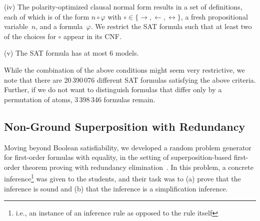 \noindent(iv)
        The polarity-optimized clausal normal form results in a set of definitions,
        each of which is of the form
        $n \circ \varphi$ with $\circ \in \{ \rightarrow, \leftarrow, \leftrightarrow \}$,
        a fresh propositional variable~$n$, and a formula~$\varphi$.
        We restrict the SAT formula such that at least two of the choices for
        $\circ$ appear in its CNF.\smallskip

\noindent(v)
        The SAT formula has at most $6$ models.
        \smallskip


While the combination of the above conditions might seem very restrictive,
we note that 
there are 20\,390\,076 different SAT formulas satisfying the above
criteria.
Further,
if we do not want to distinguish formulas that differ only by a permutation of atoms,
3\,398\,346 formulas remain.





\subsection{Non-Ground Superposition with Redundancy}\label{sec:fo}

Moving beyond Boolean satisfiability, we developed a random problem
generator for first-order formulas with equality, in the setting of
superposition-based first-order theorem proving with redundancy elimination~\cite{Rubio01,Vampire13}.
In this problem, a concrete inference\footnote{i.e., an instance of an inference rule as opposed to the rule itself}
was given to the students, and their task was to
(a) prove that the inference is sound
and (b) that the inference is a simplification inference.

